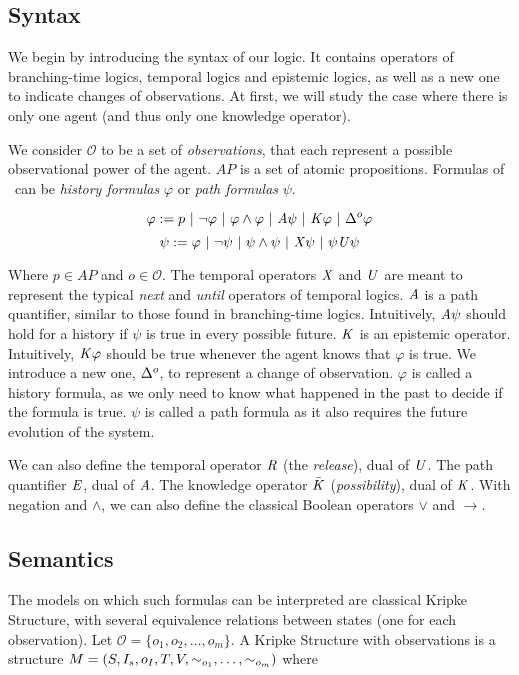 \subsection{Syntax}

We begin by introducing the syntax of our logic. It contains operators of branching-time logics, temporal logics and epistemic logics, as well as a new one to indicate changes of observations. At first, we will study the case where there is only one agent (and thus only one  knowledge operator).

We consider $\mathcal{O}$ to be a set of \textit{observations}, that each represent a possible observational power of the agent. $\mathit{AP}$ is a set of atomic propositions.
Formulas of \ctlskd\ can be \textit{history formulas} $\varphi$ or \textit{path formulas} $\psi$.

$$\varphi := p ~|~ \neg \varphi ~|~ \varphi\wedge\varphi ~|~ \mathit{A}\psi ~|~ \mathit{K}\varphi ~|~ \Delta^{o}\varphi$$
$$\psi := \varphi ~|~ \neg\psi ~|~ \psi\wedge\psi ~|~ \mathit{X}\psi ~|~ \psi\mathit{U}\psi$$

Where $p\in\mathit{AP}$ and $o\in\mathcal{O}$.
The temporal operators $\mathit{X}$ and $\mathit{U}$ are meant to represent the typical \textit{next} and \textit{until} operators of temporal logics.
$\mathit{A}$ is a path quantifier, similar to those found in branching-time logics. Intuitively, $\mathit{A}\psi$ should hold for a history if $\psi$ is true in every possible future.
$\mathit{K}$ is an epistemic operator. Intuitively, $\mathit{K}\varphi$ should be true whenever the agent knows that $\varphi$ is true. We introduce a new one, $\Delta^{o}$, to represent a change of observation.
$\varphi$ is called a history formula, as we only need to know what happened in the past to decide if the formula is true. $\psi$ is called a path formula as it also requires the future evolution of the system.

We can also define the temporal operator $\mathit{R}$ (the \textit{release}), dual of $\mathit{U}$. The path quantifier $\mathit{E}$, dual of $\mathit{A}$. The knowledge operator $\bar{\mathit{K}}$ (\textit{possibility}), dual of $\mathit{K}$. With negation and $\wedge$, we can also define the classical Boolean operators $\vee$ and $\rightarrow$.

\subsection{Semantics}

The models on which such formulas can be interpreted are classical Kripke Structure, with several equivalence relations between states (one for each observation).
Let $\mathcal{O}=\{o_1,o_2,\dots,o_m\}$.
A Kripke Structure with observations is a structure $M=(S,I_s,o_I,T,V,\sim_{o_1},\dots,\sim_{o_m})$ where

